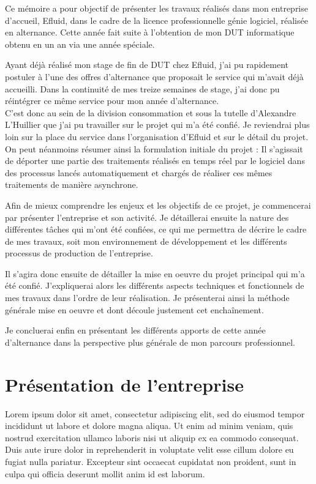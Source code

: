 \documentclass[a4paper, 12pt]{report}
\begin{document}
Ce mémoire a pour objectif de présenter les travaux réalisés dans mon entreprise d'accueil, Efluid, dans le cadre de la licence professionnelle génie logiciel, réalisée en alternance. Cette année fait suite à l'obtention de mon DUT informatique obtenu en un an via une année spéciale.

Ayant déjà réalisé mon stage de fin de DUT chez Efluid, j'ai pu rapidement postuler à l'une des offres d'alternance que proposait le service qui m'avait déjà accueilli. Dans la continuité de mes treize semaines de stage, j'ai donc pu réintégrer ce même service pour mon année d'alternance.\\

C'est donc au sein de la division consommation et sous la tutelle d'Alexandre L'Huillier que j'ai pu travailler sur le projet qui m'a été confié. Je reviendrai plus loin sur la place du service dans l'organisation d'Efluid et sur le détail du projet. On peut néanmoins résumer ainsi la formulation initiale du projet : Il s'agissait de déporter une partie des traitements réalisés en temps réel par le logiciel dans des processus lancés automatiquement et chargés de réaliser ces mêmes traitements de manière asynchrone.

Afin de mieux comprendre les enjeux et les objectifs de ce projet, je commencerai par présenter l'entreprise et son activité. Je détaillerai ensuite la nature des différentes tâches qui m'ont été confiées, ce qui me permettra de décrire le cadre de mes travaux, soit mon environnement de développement et les différents processus de production de l'entreprise. 

Il s'agira donc ensuite de détailler la mise en oeuvre du projet principal qui m'a été confié. J'expliquerai alors les différents aspects techniques et fonctionnels de mes travaux dans l'ordre de leur réalisation. Je présenterai ainsi la méthode générale mise en oeuvre et dont découle justement cet enchaînement. 

Je concluerai enfin en présentant les différents apports de cette année d'alternance dans la perspective plus générale de mon parcours professionnel.

\chapter{Présentation de l'entreprise}

Lorem ipsum dolor sit amet, consectetur adipiscing elit, sed do eiusmod tempor incididunt ut labore et dolore magna aliqua. Ut enim ad minim veniam, quis nostrud exercitation ullamco laboris nisi ut aliquip ex ea commodo consequat. Duis aute irure dolor in reprehenderit in voluptate velit esse cillum dolore eu fugiat nulla pariatur. Excepteur sint occaecat cupidatat non proident, sunt in culpa qui officia deserunt mollit anim id est laborum.
\end{document}
